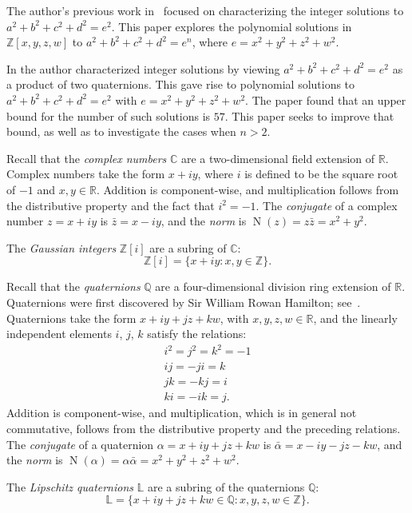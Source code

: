 \documentclass[12pt,table]{article}
\theoremstyle{definition}
\theoremstyle{remark}
\newcommand{\Ccc}{\mathbb C}
\newcommand{\Rrr}{\mathbb R}
\newcommand{\Zzz}{\mathbb Z}
\newcommand{\Lll}{\mathbb L}
\newcommand{\Qqq}{\mathbb Q}
\numberwithin{equation}{section}
\DeclareMathOperator{\N}{N}
\begin{document}
The author's previous work in~\cite{Ehrenborg_2018}
focused on characterizing the
integer solutions to
$a^2 + b^2 + c^2 + d^2 = e^2$.
This paper explores the polynomial solutions
in $ \Zzz[x,y,z,w] $ to
$a^2 + b^2 + c^2 + d^2 = e^n$, where
$e = x^2 + y^2 + z^2 + w^2$.

In \cite{Ehrenborg_2018} the author characterized integer
solutions by viewing $a^2 + b^2 + c^2 + d^2 = e^2$
as a product of two quaternions. This gave
rise to polynomial solutions to
$a^2 + b^2 + c^2 + d^2 = e^2$
with $e = x^2 + y^2 + z^2 + w^2$.
The paper found that an upper bound for the number
of such solutions is $57$. This paper seeks to
improve that bound, as well as to investigate
the cases when $n > 2$.



Recall that the \emph{complex numbers} $\Ccc$ are a two-dimensional
field extension of $\Rrr$.
Complex numbers take the form $x + iy$, where $i$ is defined to be the
square root of $-1$ and $x,y \in \Rrr$.
Addition is component-wise, and multiplication
follows from the distributive property and the fact that
$i^2 = -1$.
The \emph{conjugate} of a complex number $ z = x + iy$ is $ \bar{z} = x - iy$, and  
the \emph{norm} is $ \N(z) = z \bar{z} = x^2 + y^2$.  

The \emph{Gaussian integers} $ \Zzz[i] $ are a subring of $\Ccc$:
\[
\Zzz[i] = \{ x + iy: x,y \in \Zzz \}.
\]



Recall that
the \emph{quaternions} $\Qqq$ are a four-dimensional division ring extension of $\Rrr$.
Quaternions were first discovered by Sir William Rowan Hamilton;
see~\cite{Hamilton}.
Quaternions take the form $x + iy + jz + kw$, with
$x,y,z,w \in \Rrr$, and the linearly independent
elements $i$, $j$, $k$ satisfy the relations:
\begin{align*}
i^2 = j^2 = k^2 = -1
\\
ij = -ji = k
\\
jk = -kj = i
\\
ki = -ik = j.
\end{align*}
Addition is component-wise, and multiplication, which is
in general not commutative,
follows from the distributive property and the preceding relations.
The \emph{conjugate} of a quaternion $ \alpha = x + iy + jz + kw$
is $ \bar{\alpha} = x - iy - jz - kw$,  
and the \emph{norm} is 
$ \N( \alpha ) = \alpha \bar{\alpha} = x^2 + y^2 + z^2 + w^2$.  

The \emph{Lipschitz quaternions} $ \Lll $ are a subring of
the quaternions $\Qqq$:
\[
\Lll = \{ x + iy + jz + kw \in \Qqq: x,y,z,w \in \Zzz \}.
\]
\end{document}
